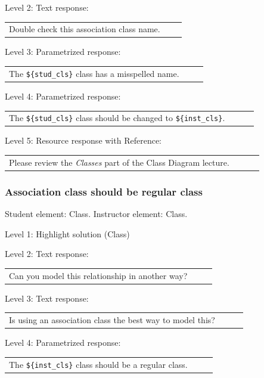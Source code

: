 \noindent Level 2: Text response: \medskip

\begin{tabular}{|p{0.9\linewidth}}
Double check this association class name.
\end{tabular} \medskip

\noindent Level 3: Parametrized response: \medskip

\begin{tabular}{|p{0.9\linewidth}}
The \verb|${stud_cls}| class has a misspelled name.
\end{tabular} \medskip

\noindent Level 4: Parametrized response: \medskip

\begin{tabular}{|p{0.9\linewidth}}
The \verb|${stud_cls}| class should be changed to \verb|${inst_cls}|.
\end{tabular} \medskip

\noindent Level 5: Resource response with Reference: \medskip

\begin{tabular}{|p{0.9\linewidth}}
Please review the \textit{Classes} part of the Class Diagram lecture.
\end{tabular} \medskip


\subsubsection{Association class should be regular class}

Student element: Class. Instructor element: Class. \medskip

\noindent Level 1: Highlight solution (Class) \medskip

\noindent Level 2: Text response: \medskip

\begin{tabular}{|p{0.9\linewidth}}
Can you model this relationship in another way?
\end{tabular} \medskip

\noindent Level 3: Text response: \medskip

\begin{tabular}{|p{0.9\linewidth}}
Is using an association class the best way to model this?
\end{tabular} \medskip

\noindent Level 4: Parametrized response: \medskip

\begin{tabular}{|p{0.9\linewidth}}
The \verb|${inst_cls}| class should be a regular class.
\end{tabular} \medskip

